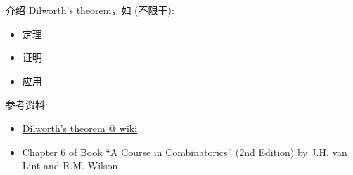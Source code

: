 \documentclass[a4paper, justified]{tufte-handout}
\begin{document}
\begin{problem}[SM Problem 14.72]
\end{problem}

\begin{solution}
\end{solution}

\begin{problem}[SM Problem 14.75]
\end{problem}

\begin{solution}
\end{solution}

\beginoptional

\begin{problem}
\end{problem}

\begin{solution}
\end{solution}

\beginot

\begin{ot}
  介绍 Dilworth's theorem，如 (不限于):
  \begin{itemize}
    \item 定理
    \item 证明
    \item 应用 
  \end{itemize}

  \noindent 参考资料:
  \begin{itemize}
    \item \href{https://en.wikipedia.org/wiki/Dilworth\%27s\_theorem}{Dilworth's theorem @ wiki}
    \item Chapter 6 of Book ``A Course in Combinatorics'' (2nd Edition) by J.H. van Lint and R.M. Wilson
  \end{itemize}
\end{ot}
\end{document}
